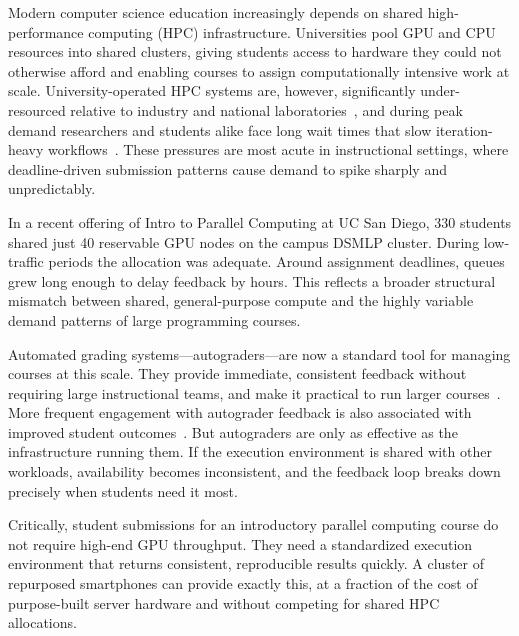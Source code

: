 \documentclass[acmlarge]{acmart}
\begin{document}
Modern computer science education increasingly depends on shared
high-performance computing (HPC) infrastructure. Universities pool GPU
and CPU resources into shared clusters, giving students access to
hardware they could not otherwise afford and enabling courses to assign
computationally intensive work at scale. University-operated HPC
systems are, however, significantly under-resourced relative to
industry and national laboratories~\cite{hpcsurvey2025}, and during
peak demand researchers and students alike face long wait times that
slow iteration-heavy workflows~\cite{hpcsurvey2025}. These pressures
are most acute in instructional settings, where deadline-driven
submission patterns cause demand to spike sharply and unpredictably.

In a recent offering of Intro to Parallel Computing at UC San Diego,
330 students shared just 40 reservable GPU nodes on the campus DSMLP
cluster. During low-traffic periods the allocation was adequate.
Around assignment deadlines, queues grew long enough to delay feedback
by hours. This reflects a broader structural mismatch between
shared, general-purpose compute and the highly variable demand
patterns of large programming courses.

Automated grading systems---autograders---are now a standard tool for
managing courses at this scale. They provide immediate, consistent
feedback without requiring large instructional teams, and make it
practical to run larger courses~\cite{keuning2018}. More frequent
engagement with autograder feedback is also associated with improved
student outcomes~\cite{tran2025}. But autograders are only as
effective as the infrastructure running them. If the execution
environment is shared with other workloads, availability becomes inconsistent, and the feedback loop breaks down precisely when students need it most.

Critically, student submissions for an introductory parallel computing
course do not require high-end GPU throughput. They need a standardized
execution environment that returns consistent, reproducible results
quickly. A cluster of repurposed smartphones can provide exactly this,
at a fraction of the cost of purpose-built server hardware and without
competing for shared HPC allocations.
\end{document}
